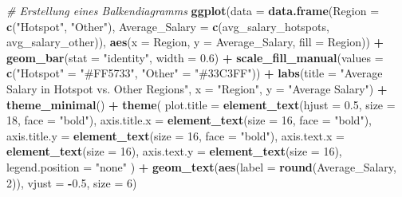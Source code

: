 \documentclass[
]{article}
\newenvironment{Shaded}{\begin{snugshade}}{\end{snugshade}}
\newcommand{\AttributeTok}[1]{\textcolor[rgb]{0.13,0.29,0.53}{#1}}
\newcommand{\CommentTok}[1]{\textcolor[rgb]{0.56,0.35,0.01}{\textit{#1}}}
\newcommand{\DecValTok}[1]{\textcolor[rgb]{0.00,0.00,0.81}{#1}}
\newcommand{\FloatTok}[1]{\textcolor[rgb]{0.00,0.00,0.81}{#1}}
\newcommand{\FunctionTok}[1]{\textcolor[rgb]{0.13,0.29,0.53}{\textbf{#1}}}
\newcommand{\NormalTok}[1]{#1}
\newcommand{\OtherTok}[1]{\textcolor[rgb]{0.56,0.35,0.01}{#1}}
\newcommand{\SpecialCharTok}[1]{\textcolor[rgb]{0.81,0.36,0.00}{\textbf{#1}}}
\newcommand{\StringTok}[1]{\textcolor[rgb]{0.31,0.60,0.02}{#1}}
\begin{document}
\begin{Shaded}
\begin{Highlighting}[]
\CommentTok{\# Erstellung eines Balkendiagramms}
\FunctionTok{ggplot}\NormalTok{(}\AttributeTok{data =} \FunctionTok{data.frame}\NormalTok{(}\AttributeTok{Region =} \FunctionTok{c}\NormalTok{(}\StringTok{"Hotspot"}\NormalTok{, }\StringTok{"Other"}\NormalTok{),}
                         \AttributeTok{Average\_Salary =} \FunctionTok{c}\NormalTok{(avg\_salary\_hotspots,}
\NormalTok{                                            avg\_salary\_other)),}
       \FunctionTok{aes}\NormalTok{(}\AttributeTok{x =}\NormalTok{ Region, }\AttributeTok{y =}\NormalTok{ Average\_Salary, }\AttributeTok{fill =}\NormalTok{ Region)) }\SpecialCharTok{+}
  \FunctionTok{geom\_bar}\NormalTok{(}\AttributeTok{stat =} \StringTok{"identity"}\NormalTok{, }\AttributeTok{width =} \FloatTok{0.6}\NormalTok{) }\SpecialCharTok{+}
  \FunctionTok{scale\_fill\_manual}\NormalTok{(}\AttributeTok{values =} \FunctionTok{c}\NormalTok{(}\StringTok{"Hotspot"} \OtherTok{=} \StringTok{"\#FF5733"}\NormalTok{, }\StringTok{"Other"} \OtherTok{=} \StringTok{"\#33C3FF"}\NormalTok{)) }\SpecialCharTok{+}
  \FunctionTok{labs}\NormalTok{(}\AttributeTok{title =} \StringTok{"Average Salary in Hotspot vs. Other Regions"}\NormalTok{,}
       \AttributeTok{x =} \StringTok{"Region"}\NormalTok{,}
       \AttributeTok{y =} \StringTok{"Average Salary"}\NormalTok{) }\SpecialCharTok{+}
  \FunctionTok{theme\_minimal}\NormalTok{() }\SpecialCharTok{+}
  \FunctionTok{theme}\NormalTok{(}
    \AttributeTok{plot.title =} \FunctionTok{element\_text}\NormalTok{(}\AttributeTok{hjust =} \FloatTok{0.5}\NormalTok{, }\AttributeTok{size =} \DecValTok{18}\NormalTok{, }\AttributeTok{face =} \StringTok{"bold"}\NormalTok{),}
    \AttributeTok{axis.title.x =} \FunctionTok{element\_text}\NormalTok{(}\AttributeTok{size =} \DecValTok{16}\NormalTok{, }\AttributeTok{face =} \StringTok{"bold"}\NormalTok{),}
    \AttributeTok{axis.title.y =} \FunctionTok{element\_text}\NormalTok{(}\AttributeTok{size =} \DecValTok{16}\NormalTok{, }\AttributeTok{face =} \StringTok{"bold"}\NormalTok{),}
    \AttributeTok{axis.text.x =} \FunctionTok{element\_text}\NormalTok{(}\AttributeTok{size =} \DecValTok{16}\NormalTok{),}
    \AttributeTok{axis.text.y =} \FunctionTok{element\_text}\NormalTok{(}\AttributeTok{size =} \DecValTok{16}\NormalTok{),}
    \AttributeTok{legend.position =} \StringTok{"none"}
\NormalTok{  ) }\SpecialCharTok{+}
  \FunctionTok{geom\_text}\NormalTok{(}\FunctionTok{aes}\NormalTok{(}\AttributeTok{label =} \FunctionTok{round}\NormalTok{(Average\_Salary, }\DecValTok{2}\NormalTok{)), }\AttributeTok{vjust =} \SpecialCharTok{{-}}\FloatTok{0.5}\NormalTok{, }\AttributeTok{size =} \DecValTok{6}\NormalTok{)}
\end{Highlighting}
\end{Shaded}
\end{document}
